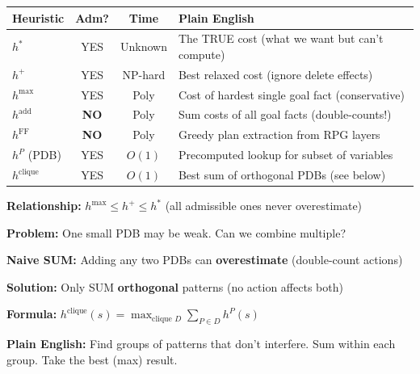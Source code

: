 \documentclass[11pt,a4paper]{article}
\begin{document}
\begin{definitionbox}
\begin{center}
\begin{tabular}{@{}lccl@{}}
\toprule
\textbf{Heuristic} & \textbf{Adm?} & \textbf{Time} & \textbf{Plain English} \\
\midrule
$h^*$ & YES & Unknown & The TRUE cost (what we want but can't compute) \\
$h^+$ & YES & NP-hard & Best relaxed cost (ignore delete effects) \\
$h^{\max}$ & YES & Poly & Cost of hardest single goal fact (conservative) \\
$h^{\text{add}}$ & \textbf{NO} & Poly & Sum costs of all goal facts (double-counts!) \\
$h^{\text{FF}}$ & \textbf{NO} & Poly & Greedy plan extraction from RPG layers \\
$h^P$ (PDB) & YES & $O(1)$ & Precomputed lookup for subset of variables \\
$h^{\text{clique}}$ & YES & $O(1)$ & Best sum of orthogonal PDBs (see below) \\
\bottomrule
\end{tabular}
\end{center}
\textbf{Relationship:} $h^{\max} \leq h^+ \leq h^*$ (all admissible ones never overestimate)
\end{definitionbox}

\begin{notebox}
\textbf{Problem:} One small PDB may be weak. Can we combine multiple?

\textbf{Naive SUM:} Adding any two PDBs can \textbf{overestimate} (double-count actions)

\textbf{Solution:} Only SUM \textbf{orthogonal} patterns (no action affects both)

\textbf{Formula:} $h^{\text{clique}}(s) = \max_{\text{clique } D} \sum_{P \in D} h^P(s)$

\textbf{Plain English:} Find groups of patterns that don't interfere. Sum within each group. Take the best (max) result.
\end{notebox}
\end{document}
